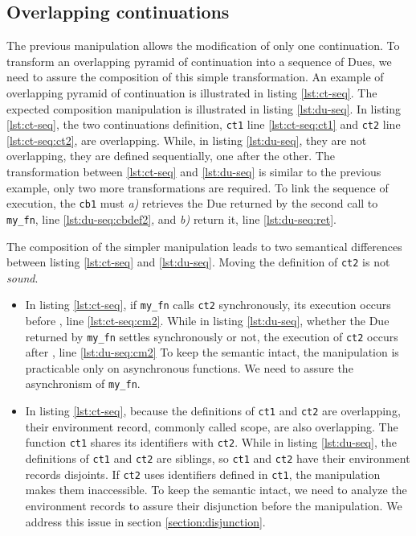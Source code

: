 \subsection{Overlapping continuations} \label{section:overlapping-continuations}

The previous manipulation allows the modification of only one continuation.
To transform an overlapping pyramid of continuation into a sequence of Dues, we need to assure the composition of this simple transformation.
An example of overlapping pyramid of continuation is illustrated in listing \ref{lst:ct-seq}.
The expected composition manipulation is illustrated in listing \ref{lst:du-seq}.
In listing \ref{lst:ct-seq}, the two continuations definition, \texttt{ct1} line \ref{lst:ct-seq:ct1} and \texttt{ct2} line \ref{lst:ct-seq:ct2}, are overlapping.
While, in listing \ref{lst:du-seq}, they are not overlapping, they are defined sequentially, one after the other.
The transformation between \ref{lst:ct-seq} and \ref{lst:du-seq} is similar to the previous example, only two more transformations are required.
To link the sequence of execution, the \texttt{cb1} must \textit{a)} retrieves the Due returned by the second call to \texttt{my_fn}, line \ref{lst:du-seq:cbdef2}, and \textit{b)} return it, line \ref{lst:du-seq:ret}.

The composition of the simpler manipulation leads to two semantical differences between listing \ref{lst:ct-seq} and \ref{lst:du-seq}.
Moving the definition of \texttt{ct2} is not \textit{sound}.
\begin{itemize}
\item In listing \ref{lst:ct-seq}, if \texttt{my\_fn} calls \texttt{ct2} synchronously, its execution occurs before , line \ref{lst:ct-seq:cm2}.
While in listing \ref{lst:du-seq}, whether the Due returned by \texttt{my\_fn} settles synchronously or not, the execution of \texttt{ct2} occurs after , line \ref{lst:du-seq:cm2}
To keep the semantic intact, the manipulation is practicable only on asynchronous functions.
We need to assure the asynchronism of \texttt{my\_fn}.
\item In listing \ref{lst:ct-seq}, because the definitions of \texttt{ct1} and \texttt{ct2} are overlapping, their environment record, commonly called scope, are also overlapping.
The function \texttt{ct1} shares its identifiers with \texttt{ct2}.
While in listing \ref{lst:du-seq}, the definitions of \texttt{ct1} and \texttt{ct2} are siblings, so \texttt{ct1} and \texttt{ct2} have their environment records disjoints.
If \texttt{ct2} uses identifiers defined in \texttt{ct1}, the manipulation makes them inaccessible.
To keep the semantic intact, we need to analyze the environment records to assure their disjunction before the manipulation. 
We address this issue in section \ref{section:disjunction}.
\end{itemize}

